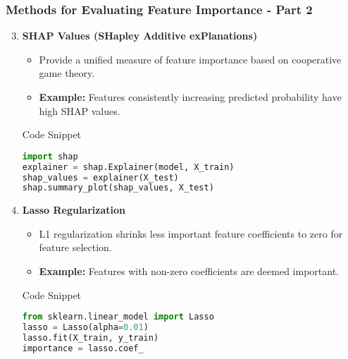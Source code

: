 \documentclass[aspectratio=169]{beamer}
\begin{document}
\begin{frame}
    \frametitle{Methods for Evaluating Feature Importance - Part 2}
    \begin{enumerate}
        \setcounter{enumi}{2}  %
        \item \textbf{SHAP Values (SHapley Additive exPlanations)}
        \begin{itemize}
            \item Provide a unified measure of feature importance based on cooperative game theory.
            \item \textbf{Example:} Features consistently increasing predicted probability have high SHAP values.
        \end{itemize}
        \begin{block}{Code Snippet}
            \begin{lstlisting}[language=Python]
import shap
explainer = shap.Explainer(model, X_train)
shap_values = explainer(X_test)
shap.summary_plot(shap_values, X_test)
            \end{lstlisting}
        \end{block}

        \item \textbf{Lasso Regularization}
        \begin{itemize}
            \item L1 regularization shrinks less important feature coefficients to zero for feature selection.
            \item \textbf{Example:} Features with non-zero coefficients are deemed important.
        \end{itemize}
        \begin{block}{Code Snippet}
            \begin{lstlisting}[language=Python]
from sklearn.linear_model import Lasso
lasso = Lasso(alpha=0.01)
lasso.fit(X_train, y_train)
importance = lasso.coef_
            \end{lstlisting}
        \end{block}
    \end{enumerate}
\end{frame}
\end{document}
